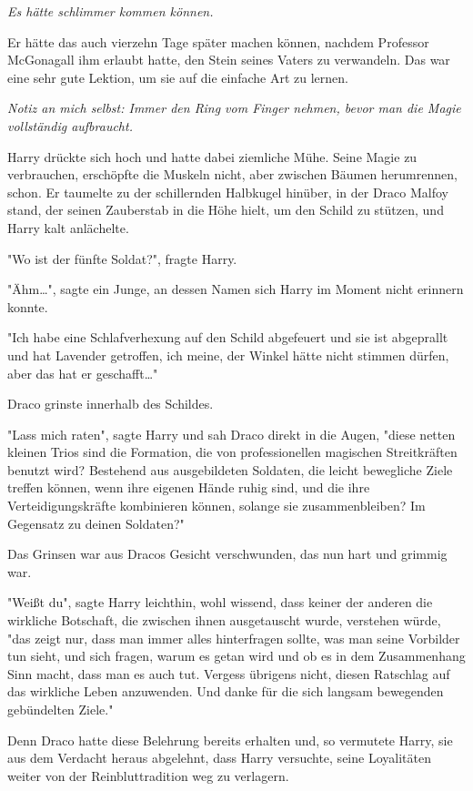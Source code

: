 {\emph{Es hätte schlimmer kommen können.}

Er hätte das auch vierzehn Tage später machen können, nachdem Professor McGonagall ihm erlaubt hatte, den Stein seines Vaters zu verwandeln. Das war eine sehr gute Lektion, um sie auf die einfache Art zu lernen.

\emph{Notiz an mich selbst: Immer den Ring vom Finger nehmen, bevor man die Magie vollständig aufbraucht.}

Harry drückte sich hoch und hatte dabei ziemliche Mühe. Seine Magie zu verbrauchen, erschöpfte die Muskeln nicht, aber zwischen Bäumen herumrennen, schon. Er taumelte zu der schillernden Halbkugel hinüber, in der Draco Malfoy stand, der seinen Zauberstab in die Höhe hielt, um den Schild zu stützen, und Harry kalt anlächelte.

"Wo ist der fünfte Soldat?", fragte Harry.

"Ähm…", sagte ein Junge, an dessen Namen sich Harry im Moment nicht erinnern konnte.

"Ich habe eine Schlafverhexung auf den Schild abgefeuert und sie ist abgeprallt und hat Lavender getroffen, ich meine, der Winkel hätte nicht stimmen dürfen, aber das hat er geschafft…"

Draco grinste innerhalb des Schildes.

"Lass mich raten", sagte Harry und sah Draco direkt in die Augen, "diese netten kleinen Trios sind die Formation, die von professionellen magischen Streitkräften benutzt wird? Bestehend aus ausgebildeten Soldaten, die leicht bewegliche Ziele treffen können, wenn ihre eigenen Hände ruhig sind, und die ihre Verteidigungskräfte kombinieren können, solange sie zusammenbleiben? Im Gegensatz zu deinen Soldaten?"

Das Grinsen war aus Dracos Gesicht verschwunden, das nun hart und grimmig war.

"Weißt du", sagte Harry leichthin, wohl wissend, dass keiner der anderen die wirkliche Botschaft, die zwischen ihnen ausgetauscht wurde, verstehen würde, "das zeigt nur, dass man immer alles hinterfragen sollte, was man seine Vorbilder tun sieht, und sich fragen, warum es getan wird und ob es in dem Zusammenhang Sinn macht, dass man es auch tut. Vergess übrigens nicht, diesen Ratschlag auf das wirkliche Leben anzuwenden. Und danke für die sich langsam bewegenden gebündelten Ziele."

Denn Draco hatte diese Belehrung bereits erhalten und, so vermutete Harry, sie aus dem Verdacht heraus abgelehnt, dass Harry versuchte, seine Loyalitäten weiter von der Reinbluttradition weg zu verlagern.

}
